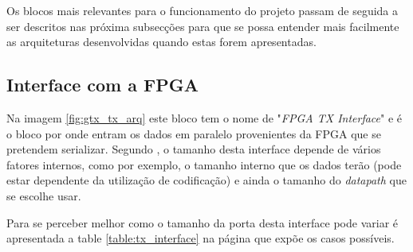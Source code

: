 Os blocos mais relevantes para o funcionamento do projeto passam de seguida a ser descritos nas próxima subsecções para que se possa entender mais facilmente as arquiteturas desenvolvidas quando estas forem apresentadas.

\subsection{Interface com a FPGA} \label{subch:tx_interface}

Na imagem \ref{fig:gtx_tx_arq} este bloco tem o nome de "\textit{FPGA TX Interface}" e é o bloco por onde entram os dados em paralelo provenientes da FPGA que se pretendem serializar. Segundo \cite{R011}, o tamanho desta interface depende de vários fatores internos, como por exemplo, o tamanho interno que os dados terão (pode estar dependente da utilização de codificação) e ainda o tamanho do \textit{datapath} que se escolhe usar.

Para se perceber melhor como o tamanho da porta desta interface pode variar é apresentada a table \ref{table:tx_interface} na página \pageref{table:tx_interface} que expõe os casos possíveis.



